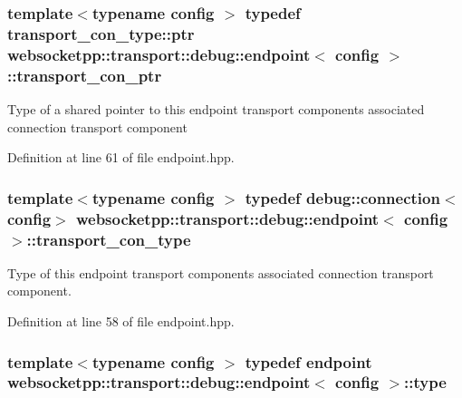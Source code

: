 \subsubsection[{transport\+\_\+con\+\_\+ptr}]{\setlength{\rightskip}{0pt plus 5cm}template$<$typename config $>$ typedef {\bf transport\+\_\+con\+\_\+type\+::ptr} {\bf websocketpp\+::transport\+::debug\+::endpoint}$<$ config $>$\+::{\bf transport\+\_\+con\+\_\+ptr}}\label{classwebsocketpp_1_1transport_1_1debug_1_1endpoint_ab261a090fca072aea9b5dba04aba4c6d}
Type of a shared pointer to this endpoint transport component\textquotesingle{}s associated connection transport component 

Definition at line 61 of file endpoint.\+hpp.

\hypertarget{classwebsocketpp_1_1transport_1_1debug_1_1endpoint_a267bc670b0cecf80aa39ee266785e9ba}{}
\subsubsection[{transport\+\_\+con\+\_\+type}]{\setlength{\rightskip}{0pt plus 5cm}template$<$typename config $>$ typedef {\bf debug\+::connection}$<$config$>$ {\bf websocketpp\+::transport\+::debug\+::endpoint}$<$ config $>$\+::{\bf transport\+\_\+con\+\_\+type}}\label{classwebsocketpp_1_1transport_1_1debug_1_1endpoint_a267bc670b0cecf80aa39ee266785e9ba}
Type of this endpoint transport component\textquotesingle{}s associated connection transport component. 

Definition at line 58 of file endpoint.\+hpp.

\hypertarget{classwebsocketpp_1_1transport_1_1debug_1_1endpoint_ad8bdfc73f0351c08dbe64143cd224ac0}{}
\subsubsection[{type}]{\setlength{\rightskip}{0pt plus 5cm}template$<$typename config $>$ typedef {\bf endpoint} {\bf websocketpp\+::transport\+::debug\+::endpoint}$<$ config $>$\+::{\bf type}}\label{classwebsocketpp_1_1transport_1_1debug_1_1endpoint_ad8bdfc73f0351c08dbe64143cd224ac0}


